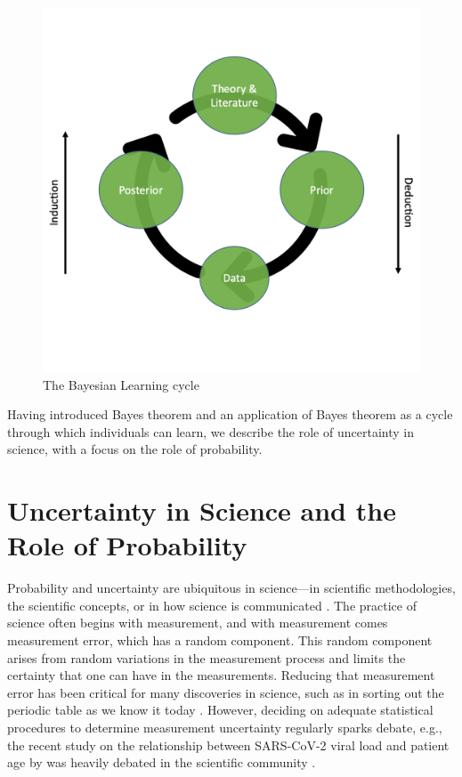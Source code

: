 \documentclass[man]{apa7}
\begin{document}
\begin{figure}[h]
\begin{center}
\includegraphics[width = .65\paperwidth]{learning.png}
\caption{The Bayesian Learning cycle}
\label{fig:The Bayesian Learning Cycle}
\end{center}
\end{figure}

Having introduced Bayes theorem and an application of Bayes theorem as a cycle through which individuals can learn, we describe the role of uncertainty in science, with a focus on the role of probability.

\section{Uncertainty in Science and the Role of Probability}

Probability and uncertainty are ubiquitous in science—in scientific methodologies, the scientific concepts, or in how science is communicated \textcite{gsoobmc17}. The practice of science often begins with measurement, and with measurement comes measurement error, which has a random component. This random component arises from random variations in the measurement process and limits the certainty that one can have in the measurements. Reducing that measurement error has been critical for many discoveries in science, such as in sorting out the periodic table as we know it today \textcite{fco15}. However, deciding on adequate statistical procedures to determine measurement uncertainty regularly sparks debate, e.g., the recent study on the relationship between SARS-CoV-2 viral load and patient age by \textcite{jmvbzhd20} was heavily debated in the scientific community \parencite{frick_peer-review_2020}.
\end{document}
